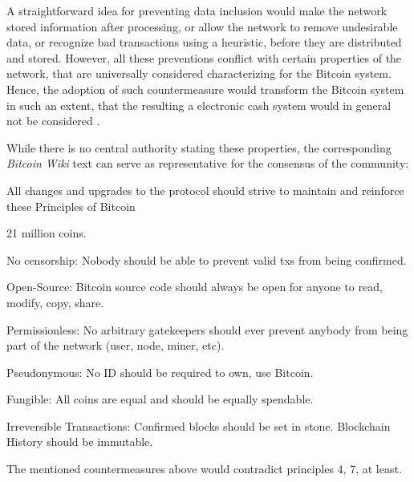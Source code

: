 \documentclass[a4paper,11pt,titlepage]{scrbook}
\begin{document}
A straightforward idea for preventing data inclusion would make the network  stored information after processing, or allow the network to remove undesirable data, or recognize bad transactions using a heuristic, before they are distributed and stored.
However, all these preventions conflict with certain properties of the network, that are universally considered characterizing for the Bitcoin system.
Hence, the adoption of such countermeasure would transform the Bitcoin system in such an extent, that the resulting a electronic cash system would in general not be considered .

While there is no central authority stating these properties, the corresponding \emph{Bitcoin Wiki} text can serve as representative for the consensus of the community:
\begin{displayquote}
    \noindent
    All changes and upgrades to the protocol should strive to maintain and reinforce these Principles of Bitcoin

    \begin{enumerate}[label={[}\arabic*.{]}]
        \item 21 million coins.
        \item No censorship: Nobody should be able to prevent valid txs from being confirmed.
        \item Open-Source: Bitcoin source code should always be open for anyone to read, modify, copy, share.
        \item Permissionless: No arbitrary gatekeepers should ever prevent anybody from being part of the network (user, node, miner, etc).
        \item Pseudonymous: No ID should be required to own, use Bitcoin.
        \item Fungible: All coins are equal and should be equally spendable.
        \item Irreversible Transactions: Confirmed blocks should be set in stone. Blockchain History should be immutable. \cite{bitcoinwiki_principles_2017}
    \end{enumerate}
\end{displayquote}
The mentioned countermeasures above would contradict principles 4, 7, at least.
\end{document}
